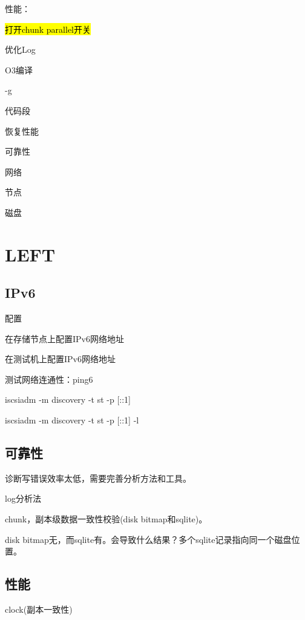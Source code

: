 性能：
\begin{enumbox}
\item \hl{打开chunk parallel开关}
\item 优化Log
\item O3编译
\item -g
\item 代码段
\item 恢复性能
\end{enumbox}

可靠性
\begin{enumbox}
\item 网络
\item 节点
\item 磁盘
\end{enumbox}

\section{LEFT}

\subsection{IPv6}

配置
\begin{enumbox}
\item 在存储节点上配置IPv6网络地址
\item 在测试机上配置IPv6网络地址
\item 测试网络连通性：ping6
\item iscsiadm -m discovery -t st -p [::1]
\item iscsiadm -m discovery -t st -p [::1] -l
\end{enumbox}


\subsection{可靠性}

诊断写错误效率太低，需要完善分析方法和工具。

log分析法

chunk，副本级数据一致性校验(disk bitmap和sqlite)。

disk bitmap无，而sqlite有。会导致什么结果？多个sqlite记录指向同一个磁盘位置。

\subsection{性能}

clock(副本一致性)

